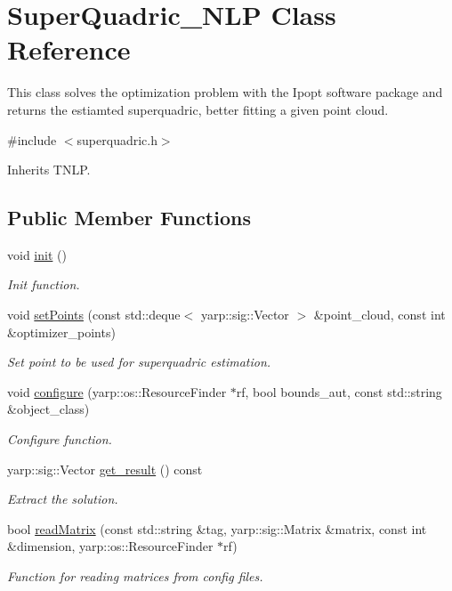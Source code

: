 \section{Super\-Quadric\-\_\-\-N\-L\-P Class Reference}
\label{classSuperQuadric__NLP}


This class solves the optimization problem with the Ipopt software package and returns the estiamted superquadric, better fitting a given point cloud.  




{\ttfamily \#include $<$superquadric.\-h$>$}



Inherits T\-N\-L\-P.

\subsection*{Public Member Functions}
\begin{DoxyCompactItemize}
\item 
void \hyperlink{classSuperQuadric__NLP_a7e39371548648a9b8d9673084ed5407d}{init} ()\label{classSuperQuadric__NLP_a7e39371548648a9b8d9673084ed5407d}

\begin{DoxyCompactList}\small\item\em Init function. \end{DoxyCompactList}\item 
void \hyperlink{classSuperQuadric__NLP_a6895a29435328142fcb31a4827742fa6}{set\-Points} (const std\-::deque$<$ yarp\-::sig\-::\-Vector $>$ \&point\-\_\-cloud, const int \&optimizer\-\_\-points)
\begin{DoxyCompactList}\small\item\em Set point to be used for superquadric estimation. \end{DoxyCompactList}\item 
void \hyperlink{classSuperQuadric__NLP_aebc2844bb4fb3ff0399fc8fef8198229}{configure} (yarp\-::os\-::\-Resource\-Finder $\ast$rf, bool bounds\-\_\-aut, const std\-::string \&object\-\_\-class)
\begin{DoxyCompactList}\small\item\em Configure function. \end{DoxyCompactList}\item 
yarp\-::sig\-::\-Vector \hyperlink{classSuperQuadric__NLP_a20d671b200f1b23358792ee81aa77552}{get\-\_\-result} () const 
\begin{DoxyCompactList}\small\item\em Extract the solution. \end{DoxyCompactList}\item 
bool \hyperlink{classSuperQuadric__NLP_a964efe0e0fe66464238f99885c6323bf}{read\-Matrix} (const std\-::string \&tag, yarp\-::sig\-::\-Matrix \&matrix, const int \&dimension, yarp\-::os\-::\-Resource\-Finder $\ast$rf)
\begin{DoxyCompactList}\small\item\em Function for reading matrices from config files. \end{DoxyCompactList}\end{DoxyCompactItemize}
